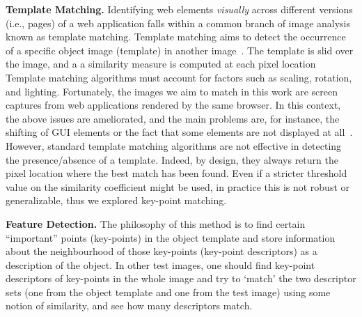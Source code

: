 \noindent
\textbf{Template Matching.}\label{sec:tm}
Identifying web elements \textit{visually} across different versions (i.e., pages) of a web application falls within a common branch of image analysis known as template matching. 
%
Template matching aims to detect the occurrence of a specific  object image (template) in another image~\cite{Brunelli:2009:TMT:1643435}. The template is slid over the image, and a a similarity measure is computed at each pixel location
%
Template matching algorithms must account for factors such as scaling, rotation, and lighting. Fortunately, the images we aim to match in this work are screen captures from web applications rendered by the same browser. In this context, the above issues are ameliorated, and the main problems are, for instance, the shifting of GUI elements or the fact that some elements are not displayed at all~\cite{}.
% 
However, standard template matching algorithms are not effective in detecting the presence/absence of a template. Indeed, by design, they always return the pixel location where the best match has been found. Even if a stricter threshold value on the similarity coefficient might be used, in practice this is not robust or generalizable, thus we explored key-point matching.

\noindent
\textbf{Feature Detection.}
The philosophy of this method is to find certain ``important'' points (key-points) in the object template and store information about the neighbourhood of those key-points (key-point descriptors) as a description of the object. In other test images, one should find key-point descriptors of key-points in the whole image and try to `match' the two descriptor sets (one from the object template and one from the test image) using some notion of similarity, and see how many descriptors match.



